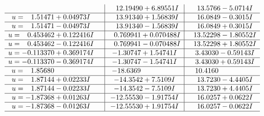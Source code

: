\documentclass[1p]{elsarticle_modified}
\theoremstyle{definition}
\begin{document}
$$\begin{array}{c|c|c}
 & \phantom{-}12.19490 + 6.89551 I & \phantom{-}13.5766 - 5.0714 I \\ \hline\begin{aligned}
u &= \phantom{-}1.51471 + 0.04973 I\end{aligned}
 & \phantom{-}13.91340 + 1.56839 I & \phantom{-}16.0849 - 0.3015 I \\ \hline\begin{aligned}
u &= \phantom{-}1.51471 - 0.04973 I\end{aligned}
 & \phantom{-}13.91340 - 1.56839 I & \phantom{-}16.0849 + 0.3015 I \\ \hline\begin{aligned}
u &= \phantom{-}0.453462 + 0.122416 I\end{aligned}
 & \phantom{-}0.769941 + 0.070488 I & \phantom{-}13.52298 - 1.80552 I \\ \hline\begin{aligned}
u &= \phantom{-}0.453462 - 0.122416 I\end{aligned}
 & \phantom{-}0.769941 - 0.070488 I & \phantom{-}13.52298 + 1.80552 I \\ \hline\begin{aligned}
u &= -0.113370 + 0.369174 I\end{aligned}
 & -1.30747 + 1.54741 I & \phantom{-}3.43030 - 0.59143 I \\ \hline\begin{aligned}
u &= -0.113370 - 0.369174 I\end{aligned}
 & -1.30747 - 1.54741 I & \phantom{-}3.43030 + 0.59143 I \\ \hline\begin{aligned}
u &= \phantom{-}1.85680\phantom{ +0.000000I}\end{aligned}
 & -18.6369\phantom{ +0.000000I} & \phantom{-}10.4160\phantom{ +0.000000I} \\ \hline\begin{aligned}
u &= \phantom{-}1.87144 + 0.02233 I\end{aligned}
 & -14.3542 + 7.5109 I & \phantom{-}13.7230 - 4.4405 I \\ \hline\begin{aligned}
u &= \phantom{-}1.87144 - 0.02233 I\end{aligned}
 & -14.3542 - 7.5109 I & \phantom{-}13.7230 + 4.4405 I \\ \hline\begin{aligned}
u &= -1.87368 + 0.01263 I\end{aligned}
 & -12.55530 - 1.91754 I & \phantom{-}16.0257 + 0.0622 I \\ \hline\begin{aligned}
u &= -1.87368 - 0.01263 I\end{aligned}
 & -12.55530 + 1.91754 I & \phantom{-}16.0257 - 0.0622 I\\
 \hline 
 \end{array}$$\newpage
\end{document}
